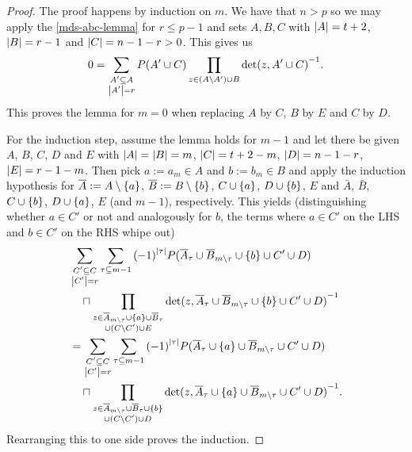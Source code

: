 \begin{proof}
    The proof happens by induction on $m$.
    We have that $n>p$ so we may apply the \autoref{mds-abc-lemma} for $r\leq p-1$ and sets $A,B,C$ with $\left|A\right|=t+2$, $\left|B\right|=r-1$ and $\left|C\right|=n-1-r>0$.
    This gives us
    $$ 0 = \sum_{\substack{A'\subseteq A\\\left|A'\right|=r}}{P(A'\cup C)\prod_{z\in (A\setminus A')\cup B}{{\det(z,A'\cup C)}^{-1}}}. $$
    This proves the lemma for $m=0$ when replacing $A$ by $C$, $B$ by $E$ and $C$ by $D$.

    For the induction step, assume the lemma holds for $m-1$ and let there be given $A$, $B$, $C$, $D$ and $E$ with $\left|A\right|=\left|B\right|=m$, $\left|C\right|=t+2-m$, $\left|D\right|=n-1-r$, $\left|E\right|=r-1-m$. Then pick $a:=a_m\in A$ and $b:=b_m\in B$ and apply the induction hypothesis for $\overline{A}:=A\setminus\left\{a\right\}$, $\overline{B}:=B\setminus\left\{b\right\}$, $C\cup\left\{a\right\}$, $D\cup\left\{b\right\}$, $E$ and $\bar{A}$, $\bar{B}$, $C\cup\left\{b\right\}$, $D\cup\left\{a\right\}$, $E$ (and $m-1$), respectively. 
    This yields (distinguishing whether $a\in C'$ or not and analogously for $b$, the terms where $a\in C'$ on the LHS and $b\in C'$ on the RHS whipe out) 
    \begin{align*}
 & \sum_{\substack{C'\setleq C                                                                   \\ \card{C'}=r}}\sum_{\tau\setleq m-1}{{(-1)}^{\card{\tau}}P(\bar{A}_{\tau}\setjoin \bar{B}_{m\setminus\tau}\setjoin\set{b}\setjoin C'\setjoin D)}\\
 & \quad\settimes\prod_{\substack{z\in \bar{A}_{m\setminus\tau}\setjoin\set{a}\setjoin \bar{B}_{\tau} \\ \setjoin(C\setminus C')\setjoin E}}{{\det(z,\bar{A}_{\tau}\setjoin \bar{B}_{m\setminus\tau}\setjoin\set{b}\setjoin C'\setjoin D)}^{-1}}\\
 & = \sum_{\substack{C'\setleq C                                                               \\
         \card{C'}=r}}\sum_{\tau\setleq m-1}{{(-1)}^{\card{\tau}}P(\bar{A}_{\tau}\setjoin\set{a}\setjoin \bar{B}_{m\setminus\tau}\setjoin C'\setjoin D)}\\
 & \quad\settimes\prod_{\substack{z\in \bar{A}_{m\setminus\tau}\setjoin \bar{B}_{\tau}\setjoin\set{b} \\\setjoin(C\setminus C')\setjoin D}}{{\det(z,\bar{A}_{\tau}\setjoin\set{a}\setjoin \bar{B}_{m\setminus\tau}\setjoin C'\setjoin D)}^{-1}}.
    \end{align*}
    Rearranging this to one side proves the induction.
\end{proof}

